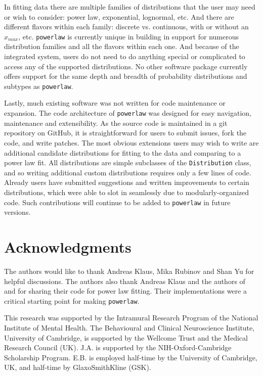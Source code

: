 \documentclass[10pt]{article}
\begin{document}
In fitting data there are multiple families of distributions that the user may need or wish to consider: power law, exponential, lognormal, etc. And there are different flavors within each family: discrete vs. continuous, with or without an $x_{max}$, etc. \verb$powerlaw$ is currently unique in building in support for numerous distribution families and all the flavors within each one. And because of the integrated system, users do not need to do anything special or complicated to access any of the supported distributions. No other software package currently offers support for the same depth and breadth of probability distributions and subtypes as \verb$powerlaw$.

Lastly, much existing software was not written for code maintenance or expansion. The code architecture of \verb$powerlaw$ was designed for easy navigation, maintenance and extensibility. As the source code is maintained in a git repository on GitHub, it is straightforward for users to submit issues, fork the code, and write patches. The most obvious extensions users may wish to write are additional candidate distributions for fitting to the data and comparing to a power law fit. All distributions are simple subclasses of the \verb$Distribution$ class, and so writing additional custom distributions requires only a few lines of code. Already users have submitted suggestions and written improvements to certain distributions, which were able to slot in seamlessly due to modularly-organized code. Such contributions will continue to be added to \verb$powerlaw$ in future versions.

\section*{Acknowledgments}
The authors would like to thank Andreas Klaus, Mika Rubinov and Shan Yu for helpful discussions. The authors also thank Andreas Klaus and the authors of \cite{Clauset2009} and \cite{Ginsburg2012} for sharing their code for power law fitting. Their implementations were a critical starting point for making \verb$powerlaw$.

This research was supported by the Intramural Research Program of the National Institute of Mental Health. The Behavioural and Clinical Neuroscience Institute, University of Cambridge, is supported by the Wellcome Trust and the Medical Research Council (UK). J.A. is supported by the NIH-Oxford-Cambridge Scholarship Program. E.B. is employed half-time by the University of Cambridge, UK, and half-time by GlaxoSmithKline (GSK).
\end{document}
